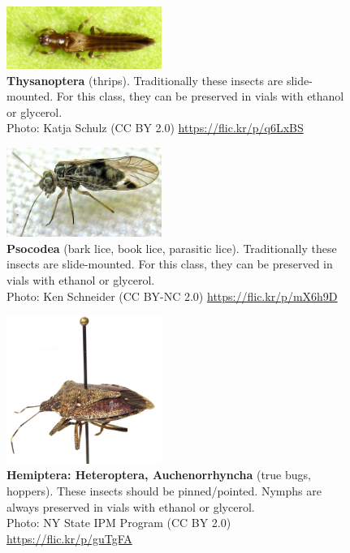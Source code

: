 \documentclass[letterpaper, 11pt]{article}
\begin{document}
\begin{figure}
  \caption{\textbf{Thysanoptera} (thrips). Traditionally these insects are slide-mounted. For this class, they can be preserved in vials with ethanol or glycerol.\\ Photo: Katja Schulz (CC BY 2.0) \url{https://flic.kr/p/q6LxBS}}
  \includegraphics[width=0.45\textwidth]{Thysanoptera}
\end{figure}

\clearpage

\begin{figure}
  \caption{\textbf{Psocodea} (bark lice, book lice, parasitic lice). Traditionally these insects are slide-mounted. For this class, they can be preserved in vials with ethanol or glycerol.\\ Photo: Ken Schneider (CC BY-NC 2.0) \url{https://flic.kr/p/mX6h9D}}
  \includegraphics[width=0.45\textwidth]{PsocodeaBark}
\end{figure}

\begin{figure}
  \caption{\textbf{Hemiptera: Heteroptera, Auchenorrhyncha} (true bugs, hoppers). These insects should be pinned/pointed. Nymphs are always preserved in vials with ethanol or glycerol.\\ Photo: NY State IPM Program (CC BY 2.0) \url{https://flic.kr/p/guTgFA}}
  \includegraphics[width=0.45\textwidth]{HemipteraHeteroptera}
\end{figure}
\end{document}
